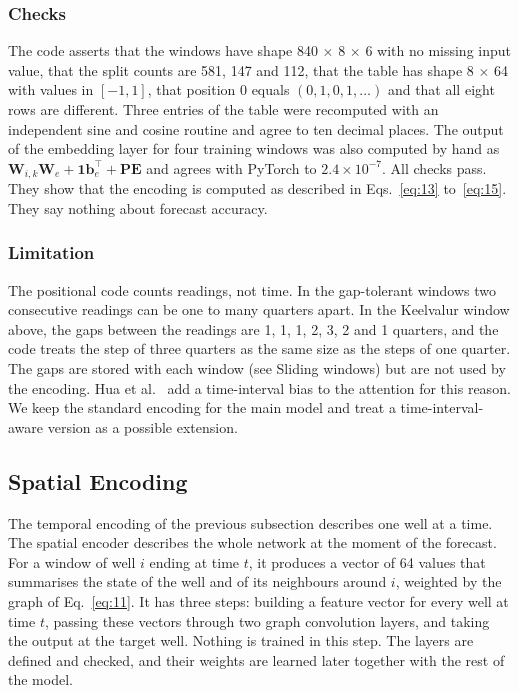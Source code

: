 \documentclass[conference]{IEEEtran}
\begin{document}
\subsubsection{Checks}

The code asserts that the windows have shape 840 \ensuremath{\times} 8 \ensuremath{\times} 6 with no missing input value, that the split counts are 581, 147 and 112, that the table has shape 8 \ensuremath{\times} 64 with values in \([-1, 1]\), that position 0 equals \((0, 1, 0, 1, \dots)\) and that all eight rows are different. Three entries of the table were recomputed with an independent sine and cosine routine and agree to ten decimal places. The output of the embedding layer for four training windows was also computed by hand as \(\mathbf{W}_{i,k}\mathbf{W}_e + \mathbf{1}\mathbf{b}_e^{\top} + \mathbf{PE}\) and agrees with PyTorch to \(2.4 \times 10^{-7}\). All checks pass. They show that the encoding is computed as described in Eqs.~\eqref{eq:13} to~\eqref{eq:15}. They say nothing about forecast accuracy.

\subsubsection{Limitation}

The positional code counts readings, not time. In the gap-tolerant windows two consecutive readings can be one to many quarters apart. In the Keelvalur window above, the gaps between the readings are 1, 1, 1, 2, 3, 2 and 1 quarters, and the code treats the step of three quarters as the same size as the steps of one quarter. The gaps are stored with each window (see Sliding windows) but are not used by the encoding. Hua et al.~\cite{ref2} add a time-interval bias to the attention for this reason. We keep the standard encoding for the main model and treat a time-interval-aware version as a possible extension.

\subsection{Spatial Encoding}

The temporal encoding of the previous subsection describes one well at a time. The spatial encoder describes the whole network at the moment of the forecast. For a window of well \(i\) ending at time \(t\), it produces a vector of 64 values that summarises the state of the well and of its neighbours around \(i\), weighted by the graph of Eq.~\eqref{eq:11}. It has three steps: building a feature vector for every well at time \(t\), passing these vectors through two graph convolution layers, and taking the output at the target well. Nothing is trained in this step. The layers are defined and checked, and their weights are learned later together with the rest of the model.
\end{document}
